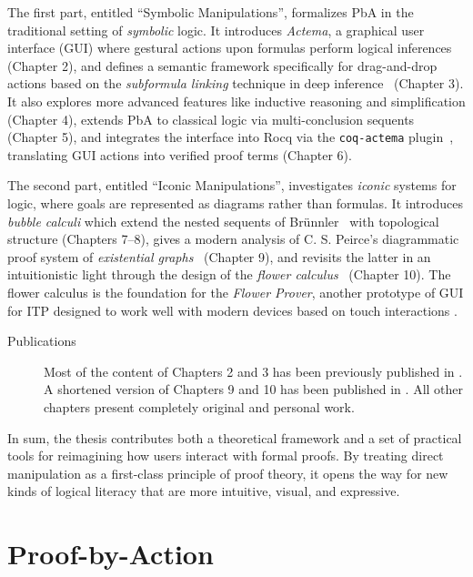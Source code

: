 \documentclass[11pt]{article}
\begin{document}
The first part, entitled ``Symbolic Manipulations'', formalizes PbA in the traditional setting of \emph{symbolic} logic. It introduces \emph{Actema}, a graphical user interface (GUI) where gestural actions upon formulas perform logical inferences~\cite{Actema:link} (Chapter 2), and defines a semantic framework specifically for drag-and-drop actions based on the \emph{subformula linking} technique in deep inference~\cite{Chaudhuri2013} (Chapter 3). It also explores more advanced features like inductive reasoning and simplification (Chapter 4), extends PbA to classical logic via multi-conclusion sequents (Chapter 5), and integrates the interface into Rocq via the \texttt{coq-actema} plugin~\cite{coq-actema}, translating GUI actions into verified proof terms (Chapter 6).

The second part, entitled ``Iconic Manipulations'', investigates \emph{iconic} systems for logic, where goals are represented as diagrams rather than formulas. It introduces \emph{bubble calculi} which extend the nested sequents of Brünnler~\cite{brunnler_deep_2009} with topological structure (Chapters 7--8), gives a modern analysis of C. S. Peirce's diagrammatic proof system of \emph{existential graphs}~\cite{Roberts+1973} (Chapter 9), and revisits the latter in an intuitionistic light through the design of the \emph{flower calculus}~\cite{flower-calculus} (Chapter 10). The flower calculus is the foundation for the \emph{Flower Prover}, another prototype of GUI for ITP designed to work well with modern devices based on touch interactions \cite{flower-prover}.

\begin{description}
    \item[Publications] Most of the content of Chapters 2 and 3 has been previously published in
    \cite{dragndrop}. A shortened version of Chapters 9 and 10 has been published
    in \cite{flower-calculus}. All other chapters present completely original and personal work.
\end{description}

In sum, the thesis contributes both a theoretical framework and a set of practical tools for reimagining how users interact with formal proofs. By treating direct manipulation as a first-class principle of proof theory, it opens the way for new kinds of logical literacy that are more intuitive, visual, and expressive.

\section{Proof-by-Action}
\end{document}
